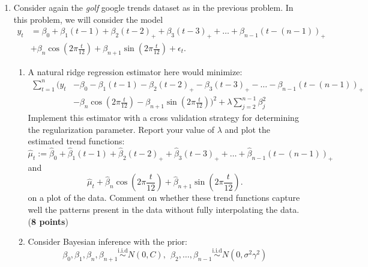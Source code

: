 \documentclass{scrartcl}
\begin{document}
\begin{enumerate}
\item Consider again the \textit{golf} google trends dataset as in the
  previous problem. In this problem, we will consider the model
  \begin{align*}
    y_t &= \beta_0 + \beta_1 (t-1) + \beta_2 (t - 2)_+ + \beta_3 (t -
   3)_+ + \dots + \beta_{n-1}(t - (n-1))_+ \\ &+ \beta_n \cos \left(2 \pi \frac{t}{12} \right) +
    \beta_{n+1} \sin \left(2 \pi \frac{t}{12} \right) + \epsilon_t. 
  \end{align*}
\begin{enumerate}  
 \item A natural ridge regression estimator here would minimize:
\begin{equation*}
  \begin{split}
    \sum_{t=1}^n \bigg(y_t & - \beta_0 - \beta_1 (t-1) - \beta_2 (t - 2)_+ - \beta_3 (t - 3)_+ - \dots - \beta_{n-1}(t - (n-1))_+ \\
    & - \beta_n \cos \left(2 \pi \frac{t}{12} \right) - \beta_{n+1}
      \sin \left(2 \pi \frac{t}{12} \right) \bigg)^2 + \lambda
      \sum_{j=2}^{n-1} \beta_j^2
  \end{split}                                                
\end{equation*}
   Implement this estimator with a cross validation strategy for
   determining the regularization parameter. Report your value of
   $\lambda$ and plot the estimated trend functions:
   \begin{equation*}
     \hat{\mu}_t := \hat{\beta}_0 + \hat{\beta}_1 (t-1) +
     \hat{\beta}_2 (t - 2)_+ + \hat{\beta}_3 (t - 
   3)_+ + \dots + \hat{\beta}_{n-1}(t - (n-1))_+
 \end{equation*}
 and
 \begin{equation*}
   \hat{\mu}_t + \hat{\beta}_n \cos \left(2 \pi \frac{t}{12} \right) + \hat{\beta}_{n+1}
      \sin \left(2 \pi \frac{t}{12} \right). 
 \end{equation*}
on a plot of the data. Comment
   on whether these trend functions capture well the patterns
   present in the data without fully interpolating the
   data. (\textbf{8 points}) 
 \item Consider Bayesian inference with the prior:
   \begin{equation*}
     \beta_0, \beta_1, \beta_n, \beta_{n+1}
     \overset{\text{i.i.d}}{\sim} N(0, C), ~~ \beta_2, \dots,
     \beta_{n-1} 
     \overset{\text{i.i.d}}{\sim} N(0, \sigma^2 \gamma^2)
   \end{equation*}

\end{enumerate}
\end{enumerate}
\end{document}
